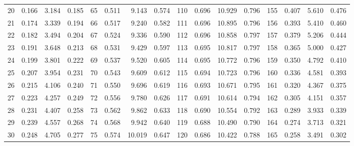 \begin{table}[!h]
{\begin{tabular}{rrrr|rrrr|rrrr|rrrr}
 20 & \tiny{  0.166} &   3.184 & \tiny{  0.185} &  65 & \tiny{  0.511} &   9.143 & \tiny{  0.574} & 110 & \tiny{  0.696} &  10.929 & \tiny{  0.796} & 155 & \tiny{  0.407} &   5.610 & \tiny{  0.476}\\
 21 & \tiny{  0.174} &   3.339 & \tiny{  0.194} &  66 & \tiny{  0.517} &   9.240 & \tiny{  0.582} & 111 & \tiny{  0.696} &  10.895 & \tiny{  0.796} & 156 & \tiny{  0.393} &   5.410 & \tiny{  0.460}\\
 22 & \tiny{  0.182} &   3.494 & \tiny{  0.204} &  67 & \tiny{  0.524} &   9.336 & \tiny{  0.590} & 112 & \tiny{  0.696} &  10.858 & \tiny{  0.797} & 157 & \tiny{  0.379} &   5.206 & \tiny{  0.444}\\
 23 & \tiny{  0.191} &   3.648 & \tiny{  0.213} &  68 & \tiny{  0.531} &   9.429 & \tiny{  0.597} & 113 & \tiny{  0.695} &  10.817 & \tiny{  0.797} & 158 & \tiny{  0.365} &   5.000 & \tiny{  0.427}\\
 24 & \tiny{  0.199} &   3.801 & \tiny{  0.222} &  69 & \tiny{  0.537} &   9.520 & \tiny{  0.605} & 114 & \tiny{  0.695} &  10.772 & \tiny{  0.796} & 159 & \tiny{  0.350} &   4.792 & \tiny{  0.410}\\
 25 & \tiny{  0.207} &   3.954 & \tiny{  0.231} &  70 & \tiny{  0.543} &   9.609 & \tiny{  0.612} & 115 & \tiny{  0.694} &  10.723 & \tiny{  0.796} & 160 & \tiny{  0.336} &   4.581 & \tiny{  0.393}\\
 26 & \tiny{  0.215} &   4.106 & \tiny{  0.240} &  71 & \tiny{  0.550} &   9.696 & \tiny{  0.619} & 116 & \tiny{  0.693} &  10.671 & \tiny{  0.795} & 161 & \tiny{  0.320} &   4.367 & \tiny{  0.375}\\
 27 & \tiny{  0.223} &   4.257 & \tiny{  0.249} &  72 & \tiny{  0.556} &   9.780 & \tiny{  0.626} & 117 & \tiny{  0.691} &  10.614 & \tiny{  0.794} & 162 & \tiny{  0.305} &   4.151 & \tiny{  0.357}\\
 28 & \tiny{  0.231} &   4.407 & \tiny{  0.258} &  73 & \tiny{  0.562} &   9.862 & \tiny{  0.633} & 118 & \tiny{  0.690} &  10.554 & \tiny{  0.792} & 163 & \tiny{  0.289} &   3.933 & \tiny{  0.339}\\
 29 & \tiny{  0.239} &   4.557 & \tiny{  0.268} &  74 & \tiny{  0.568} &   9.942 & \tiny{  0.640} & 119 & \tiny{  0.688} &  10.490 & \tiny{  0.790} & 164 & \tiny{  0.274} &   3.713 & \tiny{  0.321}\\
 30 & \tiny{  0.248} &   4.705 & \tiny{  0.277} &  75 & \tiny{  0.574} &  10.019 & \tiny{  0.647} & 120 & \tiny{  0.686} &  10.422 & \tiny{  0.788} & 165 & \tiny{  0.258} &   3.491 & \tiny{  0.302}\\

\end{tabular}}
\end{table}
